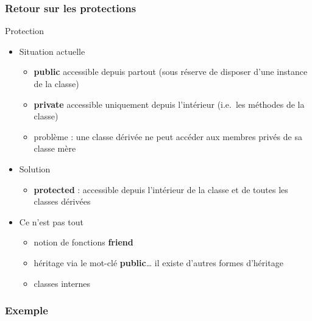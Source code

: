 \subsubsection{Retour sur les protections}

\begin{frame}{Protection}

\begin{itemize}
\itemsep1pt\parskip0pt
\item
  Situation actuelle

  \begin{itemize}
  \itemsep1pt\parskip0pt
  \item
    \textbf{public} accessible depuis partout (sous réserve de disposer
    d'une instance de la classe)
  \item
    \textbf{private} accessible uniquement depuis l'intérieur (i.e.~les
    méthodes de la classe)
  \item
    problème : une classe dérivée ne peut accéder aux membres privés de
    sa classe mère
  \end{itemize}
\item
  Solution

  \begin{itemize}
  \itemsep1pt\parskip0pt
  \item
    \textbf{protected} : accessible depuis l'intérieur de la classe et
    de toutes les classes dérivées
  \end{itemize}
\item
  Ce n'est pas tout

  \begin{itemize}
  \itemsep1pt\parskip0pt
  \item
    notion de fonctions \textbf{friend}
  \item
    héritage via le mot-clé \textbf{public}\ldots{} il existe d'autres
    formes d'héritage
  \item
    classes internes
  \end{itemize}
\end{itemize}

\end{frame}

\subsubsection{Exemple}

